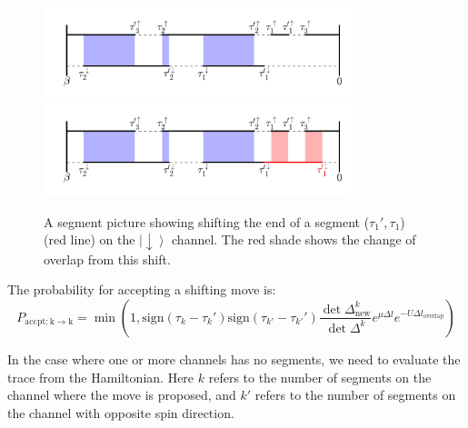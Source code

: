 \begin{figure}[ht]
  \centering
  \includegraphics[width=0.8\textwidth] {img/segment.png}
  \includegraphics[width=0.8\textwidth] {img/segment_shift.png}
  \caption{A segment picture showing shifting the end of a segment ($\tau_1',\tau_1$)
(red line) on the $\left|\downarrow\right\rangle$ channel. The red shade shows the
change of overlap from this shift.
}

\label{fig:seg_shift}
\end{figure}

The probability for accepting a shifting move is:
\begin{equation}
P_\mathrm{accpt:k\rightarrow k}=\min\left(1,
  \mathrm{sign}(\tau_k-\tau_k')\mathrm{sign}(\tau_{k'}-\tau_{k'}')
  \frac{\det\Delta^{k}_{\mathrm{new}}}{\det\Delta^{k}}
  e^{\mu\Delta l}e^{-U \Delta l_\mathrm{overlap}}
\right)
\end{equation}

In the case where one or more channels has no segments, we need to evaluate the trace
from the Hamiltonian. Here $k$ refers to the number of segments on the channel
where the move is proposed, and $k'$ refers to the number of segments on the
channel with opposite spin direction.

